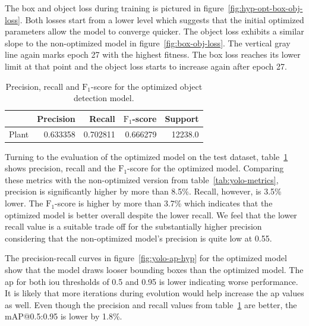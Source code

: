 \documentclass[draft,final]{vutinfth} %
\begin{document}
The box and object loss during training is pictured in
figure~\ref{fig:hyp-opt-box-obj-loss}. Both losses start from a lower
level which suggests that the initial optimized parameters allow the
model to converge quicker. The object loss exhibits a similar slope to
the non-optimized model in figure~\ref{fig:box-obj-loss}. The vertical
gray line again marks epoch 27 with the highest fitness. The box loss
reaches its lower limit at that point and the object loss starts to
increase again after epoch 27.

\begin{table}[h]
  \centering
  \begin{tabular}{lrrrr}
    \toprule
    {} &  Precision &    Recall &  $\mathrm{F}_1$-score &  Support \\
    \midrule
    Plant        &   0.633358 &  0.702811 &  0.666279 &  12238.0 \\
    \bottomrule
  \end{tabular}
  \caption{Precision, recall and $\mathrm{F}_1$-score for the
    optimized object detection model.}
  \label{tab:yolo-metrics-hyp}
\end{table}

Turning to the evaluation of the optimized model on the test dataset,
table~\ref{tab:yolo-metrics-hyp} shows precision, recall and the
$\mathrm{F}_1$-score for the optimized model. Comparing these metrics
with the non-optimized version from table~\ref{tab:yolo-metrics},
precision is significantly higher by more than 8.5\%. Recall, however,
is 3.5\% lower. The $\mathrm{F}_1$-score is higher by more than 3.7\%
which indicates that the optimized model is better overall despite the
lower recall. We feel that the lower recall value is a suitable trade
off for the substantially higher precision considering that the
non-optimized model's precision is quite low at 0.55.

The precision-recall curves in figure~\ref{fig:yolo-ap-hyp} for the
optimized model show that the model draws looser bounding boxes than
the optimized model. The \gls{ap} for both \gls{iou} thresholds of 0.5
and 0.95 is lower indicating worse performance. It is likely that more
iterations during evolution would help increase the \gls{ap} values as
well. Even though the precision and recall values from
table~\ref{tab:yolo-metrics-hyp} are better, the \textsf{mAP}@0.5:0.95
is lower by 1.8\%.
\end{document}
